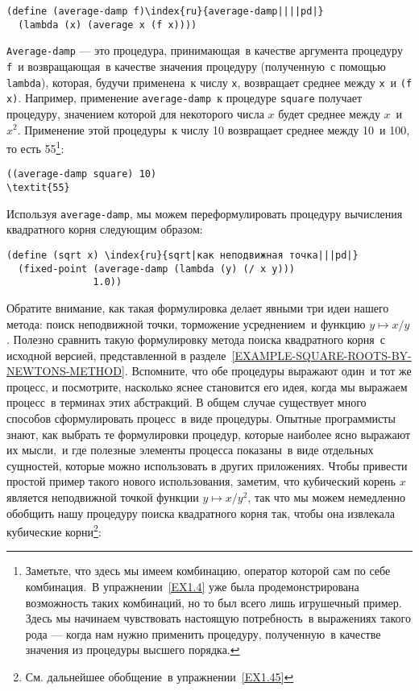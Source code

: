 \begin{Verbatim}[fontsize=\small]
(define (average-damp f)\index{ru}{average-damp||||pd|}
  (lambda (x) (average x (f x))))
\end{Verbatim}
{\tt Average-damp} --- это процедура, принимающая~в качестве
аргумента процедуру {\tt f}~и возвращающая~в качестве значения
процедуру (полученную~с помощью {\tt lambda}), которая, будучи
применена~к числу {\tt x}, возвращает среднее между
{\tt x}~и {\tt (f x)}.  Например, применение
{\tt average-damp}~к процедуре {\tt square} получает
процедуру, значением которой для некоторого числа $x$ будет 
среднее между $x$~и $x^2$.  Применение этой
процедуры~к числу 10 возвращает среднее между 10~и 100, то есть 55\footnote{Заметьте, что здесь мы имеем 
комбинацию, оператор
которой сам по себе комбинация.~В упражнении~\ref{EX1.4} уже 
была продемонстрирована возможность таких комбинаций, но то был всего
лишь игрушечный пример.  Здесь мы начинаем чувствовать настоящую
потребность~в выражениях такого рода --- когда нам нужно применить
процедуру, полученную~в качестве значения из процедуры высшего порядка.
}:

\begin{Verbatim}[fontsize=\small]
((average-damp square) 10)
\textit{55}
\end{Verbatim}

 Используя {\tt average-damp}, мы можем
переформулировать процедуру вычисления квадратного корня следующим
образом:

\begin{Verbatim}[fontsize=\small]
(define (sqrt x) \index{ru}{sqrt|как неподвижная точка|||pd|}
  (fixed-point (average-damp (lambda (y) (/ x y)))
               1.0))
\end{Verbatim}
Обратите внимание, как такая формулировка делает явными три идеи нашего метода: 
поиск неподвижной точки, торможение усреднением~и функцию $y
\mapsto x / y$.  Полезно сравнить такую формулировку метода
поиска квадратного корня~с исходной версией, представленной в
разделе~\ref{EXAMPLE-SQUARE-ROOTS-BY-NEWTONS-METHOD}.
Вспомните, что обе процедуры выражают один~и тот же процесс, и
посмотрите, насколько яснее становится его идея, когда мы выражаем
процесс~в терминах этих абстракций. В общем случае существует много
способов сформулировать процесс~в виде процедуры.  Опытные
программисты знают, как выбрать те формулировки процедур, которые
наиболее ясно выражают их мысли,~и где полезные элементы процесса
показаны~в виде отдельных сущностей, которые можно использовать в
других приложениях.  Чтобы привести простой пример такого нового использования,
заметим, что кубический корень $x$ является неподвижной
точкой функции $y \mapsto x / y^2$, так что мы можем
немедленно обобщить нашу процедуру поиска квадратного корня так, чтобы
она извлекала кубические корни\footnote{См. дальнейшее обобщение~в упражнении~\ref{EX1.45}}:

